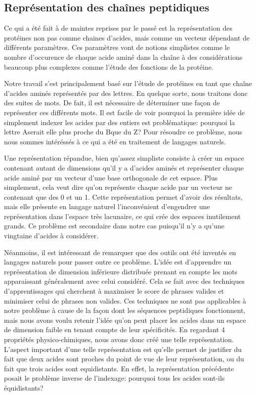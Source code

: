 \documentclass[a4paper, 11pt, onecolumn]{article}
\begin{document}
\subsection{Représentation des chaînes peptidiques}

Ce qui a été fait à de maintes reprises par le passé est la représentation des
protéines non pas comme chaines d'acides, mais comme un vecteur dépendant de
différents paramètres. Ces paramètres vont de notions simplistes comme le nombre
d'occurence de chaque acide aminé dans la chaîne à des considérations beaucoup
plus complexes comme l'étude des fonctions de la protéine.

Notre travail s'est principalement basé sur l'étude de protéines en tant que
chaîne d'acides aminés représentés par des lettres. En quelque sorte, nous traitons donc des suites de \og
mots\fg. De fait, il est nécessaire de déterminer une façon de représenter ces
différents mots. Il est facile de voir pourquoi la première idée de simplement
indexer les acides par des entiers est problématique: pourquoi la lettre \og
A\fg serait elle plus proche du \og B\fg que du \og Z\fg? Pour résoudre ce
problème, nous nous sommes intéréssés à ce qui a été en traitement de langages
naturels.

Une représentation répandue, bien qu'assez simpliste consiste à créer un espace
contenant autant de dimensions qu'il y a d'acides aminés et représenter chaque
acide aminé par un vecteur d'une base orthogonale de cet espace. Plus
simplement, cela veut dire qu'on représente chaque acide par un vecteur ne
contenant que des 0 et un 1. Cette représentation permet d'avoir des résultats,
mais elle présente en langage naturel l'inconvénient d'engendrer une
représentation dans l'espace très lacunaire, ce qui crée des espaces inutilement
grands. Ce problème est secondaire dans notre cas puisqu'il n'y a qu'une
vingtaine d'acides à considérer.

Néanmoins, il est intéressant de remarquer que des outils ont été inventés en
langages naturels pour passer outre ce problème. L'idée est d'apprendre un
représentation de dimension inférieure distribuée prenant en compte les mots
apparaissant généralement avec celui considéré. Cela se fait avec des techniques
d'apprentissages qui cherchent à maximiser le score de phrases valides et
minimiser celui de phrases non valides. Ces techniques ne sont pas applicables à
notre problème à cause de la façon dont les séquences peptidiques fonctionnent,
mais nous avons voulu retenir l'idée qu'on peut placer les acides dans un espace
de dimension faible en tenant compte de leur spécificités. En regardant 4
propriétés physico-chimiques, nous avons donc créé une telle représentation.
L'aspect important d'une telle représentation est qu'elle permet de justifier du
fait que deux acides sont proches du point de vue de leur représentation, ou du
fait que trois acides sont equidistants. En effet, la représentation précédente
posait le problème inverse de l'indexage: pourquoi tous les acides sont-ils équidistants?
\end{document}
